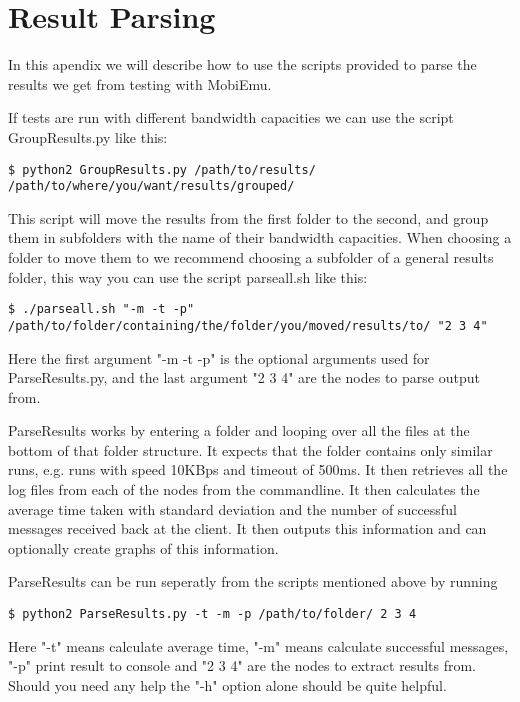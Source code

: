 \section{Result Parsing}\label{Result Parsing}
    In this apendix we will describe how to use the scripts provided to parse the results we get from testing with MobiEmu.
    
    If tests are run with different bandwidth capacities we can use the script GroupResults.py like this:
    \lstset{language=bash, style=shell}
    \begin{lstlisting}
$ python2 GroupResults.py /path/to/results/ /path/to/where/you/want/results/grouped/
    \end{lstlisting}
    This script will move the results from the first folder to the second, and group them in subfolders with the name of their bandwidth capacities. When choosing a folder to move them to we recommend choosing a subfolder of a general results folder, this way you can use the script parseall.sh like this:
    \begin{lstlisting}
$ ./parseall.sh "-m -t -p" /path/to/folder/containing/the/folder/you/moved/results/to/ "2 3 4"
    \end{lstlisting}
    Here the first argument "-m -t -p" is the optional arguments used for ParseResults.py, and the last argument "2 3 4" are the nodes to parse output from.
    
    ParseResults works by entering a folder and looping over all the files at the bottom of that folder structure. It expects that the folder contains only similar runs, e.g. runs with speed 10KBps and timeout of 500ms. It then retrieves all the log files from each of the nodes from the commandline. It then calculates the average time taken with standard deviation and the number of successful messages received back at the client. It then outputs this information and can optionally create graphs of this information.
    
    ParseResults can be run seperatly from the scripts mentioned above by running
    \begin{lstlisting}
$ python2 ParseResults.py -t -m -p /path/to/folder/ 2 3 4
    \end{lstlisting}
    Here "-t" means calculate average time, "-m" means calculate successful messages, "-p" print result to console and "2 3 4" are the nodes to extract results from. Should you need any help the "-h" option alone should be quite helpful.
